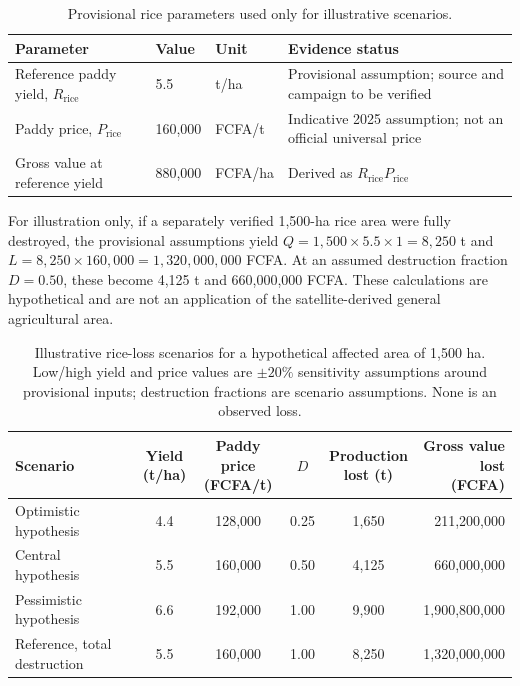 \documentclass[pdflatex,sn-mathphys,Numbered]{sn-jnl}
\begin{document}
\begin{table}[t]
\centering
\caption{Provisional rice parameters used only for illustrative scenarios.}
\label{tab:rice-parameters}
\small
\setlength{\tabcolsep}{3pt}
\begin{tabularx}{\textwidth}{@{}p{}p{}p{}X@{}}
\toprule
Parameter & Value & Unit & Evidence status \\
\midrule
Reference paddy yield, $R_{\mathrm{rice}}$ & 5.5 & t/ha & Provisional assumption; source and campaign to be verified \\
Paddy price, $P_{\mathrm{rice}}$ & 160,000 & FCFA/t & Indicative 2025 assumption; not an official universal price \\
Gross value at reference yield & 880,000 & FCFA/ha & Derived as $R_{\mathrm{rice}}P_{\mathrm{rice}}$ \\
\bottomrule
\end{tabularx}
\end{table}

For illustration only, if a separately verified 1,500-ha rice area were fully destroyed, the provisional assumptions yield $Q=1{,}500\times5.5\times1=8{,}250$ t and $L=8{,}250\times160{,}000=1{,}320{,}000{,}000$ FCFA. At an assumed destruction fraction $D=0.50$, these become 4,125 t and 660,000,000 FCFA. These calculations are hypothetical and are not an application of the satellite-derived general agricultural area.

\begin{table}[t]
\centering
\caption{Illustrative rice-loss scenarios for a hypothetical affected area of 1,500 ha. Low/high yield and price values are $\pm20\%$ sensitivity assumptions around provisional inputs; destruction fractions are scenario assumptions. None is an observed loss.}
\label{tab:rice-loss-scenarios}
\small
\setlength{\tabcolsep}{3pt}
\renewcommand{\arraystretch}{1.15}
\begin{tabularx}{\textwidth}{@{}X c c c c r@{}}
\toprule
Scenario &
\makecell{Yield\\(t/ha)} &
\makecell{Paddy price\\(FCFA/t)} &
$D$ &
\makecell{Production\\lost (t)} &
\makecell{Gross value\\lost (FCFA)} \\
\midrule
Optimistic hypothesis & 4.4 & 128,000 & 0.25 & 1,650 & 211,200,000 \\
Central hypothesis & 5.5 & 160,000 & 0.50 & 4,125 & 660,000,000 \\
Pessimistic hypothesis & 6.6 & 192,000 & 1.00 & 9,900 & 1,900,800,000 \\
Reference, total destruction & 5.5 & 160,000 & 1.00 & 8,250 & 1,320,000,000 \\
\bottomrule
\end{tabularx}
\end{table}
\end{document}
